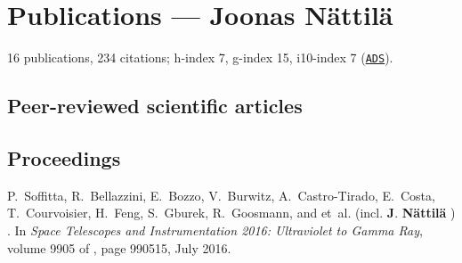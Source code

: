 \documentclass[10pt]{article}
\begin{document}
\newpage

\section*{Publications --- Joonas N\"attil\"a}
16 publications, 234 citations; h-index 7, g-index 15, i10-index 7 (\href{http://adsabs.harvard.edu/cgi-bin/abs_connect?author=nattila,+J.&aut_syn=YES&return_req=no_params}{\nolinkurl{ADS}}).

\subsection*{\phantom{sub} Peer-reviewed scientific articles}

\vspace{-20pt}
\renewcommand\refname{\phantom{bla}}



\nocite{*}


\subsection*{\phantom{sub} Proceedings}
\vspace{-20pt}
\begin{thebibliography}{1}
\vspace{-5pt}

P.~{Soffitta}, R.~{Bellazzini}, E.~{Bozzo}, V.~{Burwitz}, A.~{Castro-Tirado},
  E.~{Costa}, T.~{Courvoisier}, H.~{Feng}, S.~{Gburek}, R.~{Goosmann}, and
  et~al. (incl. \textbf{J}. \textbf{{N{\"a}ttil{\"a}}} )
.
\newblock In {\em Space Telescopes and Instrumentation 2016: Ultraviolet to
  Gamma Ray}, volume 9905 of {\em \procspie}, page 990515, July 2016.


\end{thebibliography}
\end{document}
